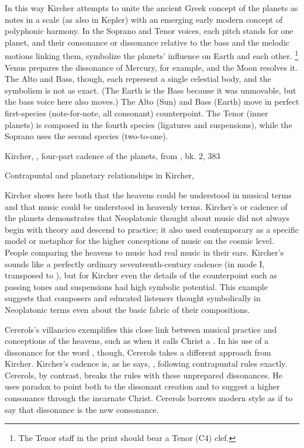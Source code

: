 In this way Kircher attempts to unite the ancient Greek concept of the planets
as notes in a scale (as also in Kepler) with an emerging early modern concept of
polyphonic harmony.
In the Soprano and Tenor voices, each pitch stands for one planet, and their
consonance or dissonance relative to the bass and the melodic motions linking
them, symbolize the planets' influence on Earth and each other.%
    \footnote{The Tenor staff in the print should bear a Tenor (C4) clef.}
Venus prepares the dissonance of Mercury, for example, and the Moon resolves it.
The Alto and Bass, though, each represent a single celestial body, and the
symbolism is not as exact.
(The Earth is the Bass because it was unmovable, but the bass voice here also
moves.)
The Alto (Sun) and Bass (Earth) move in perfect first-species (note-for-note,
all consonant) counterpoint.
The Tenor (inner planets) is composed in the fourth species (ligatures and
suspensions), while the Soprano uses the second species (two-to-one).

{Kircher, ,
four-part cadence of the planets, from , bk. 2,
383}

{Contrapuntal and planetary relationships in Kircher, }

Kircher shows here both that the heavens could be understood in musical terms
and that music could be understood in heavenly terms.
Kircher's  or cadence of the planets demonstrates that
Neoplatonic thought about music did not always begin with theory and descend to
practice; it also used contemporary  as a specific
model or metaphor for the higher conceptions of music on the cosmic level. 
People comparing the heavens to music had real music in their ears.
Kircher's  sounds like a perfectly ordinary seventeenth-century
cadence (in mode I, transposed to ), but for Kircher even
the  details of the counterpoint such as passing tones and
suspensions had high symbolic potential.
This example suggests that composers and educated listeners thought symbolically
in Neoplatonic terms even about the basic fabric of their compositions.

Cererols's villancico exemplifies this close link between musical practice and
conceptions of the heavens, such as when it calls Christ a .
In his use of a dissonance for the word , though, Cererols
takes a different approach from Kircher.
Kircher's cadence is, as he says, , following
contrapuntal rules exactly.
Cererols, by contrast, breaks the rules with these unprepared dissonances.
He uses paradox to point both to the dissonant creation and to suggest a higher
consonance through the incarnate Christ.
Cererols borrows modern style as if to say that dissonance is the new
consonance.

